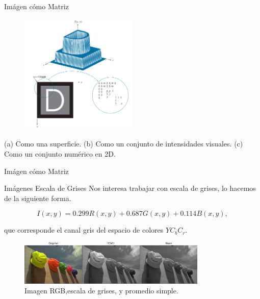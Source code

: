 \documentclass{beamer}
\begin{document}
\begin{frame}{Imágen cómo Matriz}
    \begin{figure}[H]
        \centering
        \includegraphics[width=0.5\textwidth]{dip_4_fig2_18.png}
    \end{figure}        
    (a) Como una superficie.
    (b) Como un conjunto de intensidades visuales.
    (c) Como un conjunto numérico en 2D.
\end{frame}

\begin{frame}{Imágen cómo Matriz}
    \begin{block}{Im\'agenes Escala de Grises}
        Nos interesa trabajar con escala de grises, lo hacemos de la siguiente forma.

        \begin{equation}
            I(x, y)=0.299 R(x, y)+0.687 G(x, y)+0.114 B(x, y), 
            \label{eq:grayscale}
        \end{equation}

        que corresponde el canal gris del espacio de colores $YC_bC_r$.
    \end{block}

    \begin{figure}[H]
        \centering
        \includegraphics[width=0.8\textwidth]{img_ex_bw.png}
        \caption{Imagen RGB,escala de grises, y promedio simple.}
    \end{figure}
\end{frame}
\end{document}
